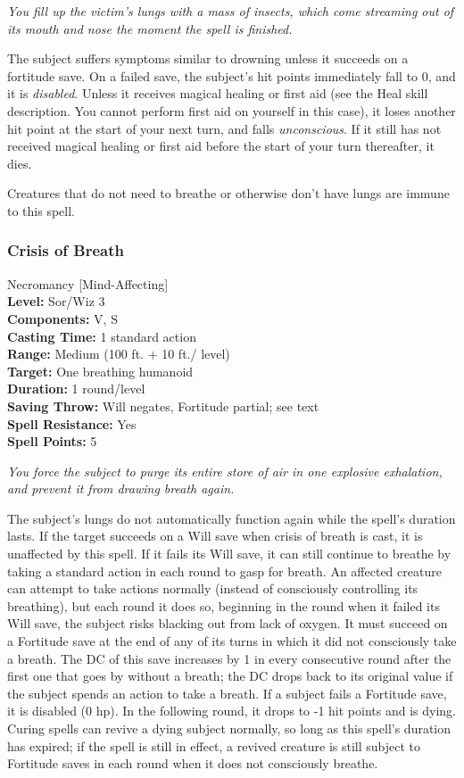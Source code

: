 \emph{You fill up the victim's lungs with a mass of insects, which come streaming out of its mouth and nose the moment the spell is finished.}

The subject suffers symptoms similar to drowning unless it succeeds on a fortitude save.
On a failed save, the subject's hit points immediately fall to 0, and it is \emph{disabled}.
Unless it receives magical healing or first aid (see the Heal skill description. You cannot perform first aid on yourself in this case), it loses another hit point at the start of your next turn, and falls \emph{unconscious}. If it still has not received magical healing or first aid before the start of your turn thereafter, it dies.

Creatures that do not need to breathe or otherwise don't have lungs are immune to this spell.
\subsubsection{Crisis of Breath}
\label{Spell:CrisisOfBreath}
Necromancy [Mind-Affecting]
\\ \textbf{Level:} Sor/Wiz 3
\\ \textbf{Components:} V, S
\\ \textbf{Casting Time:} 1 standard action
\\ \textbf{Range:} Medium (100 ft. + 10 ft./ level)
\\ \textbf{Target:} One breathing humanoid
\\ \textbf{Duration:} 1 round/level
\\ \textbf{Saving Throw:} Will negates, Fortitude partial; see text
\\ \textbf{Spell Resistance:} Yes
\\ \textbf{Spell Points:} 5

\emph{You force the subject to purge its entire store of air in one explosive exhalation, and prevent it from drawing breath again.}

The subject's lungs do not automatically function again while the spell's duration lasts.
If the target succeeds on a Will save when crisis of breath is cast, it is unaffected by this spell. 
If it fails its Will save, it can still continue to breathe by taking a standard action in each round to gasp for breath.
An affected creature can attempt to take actions normally (instead of consciously controlling its breathing), 
but each round it does so, beginning in the round when it failed its Will save, the subject risks blacking out from lack of oxygen. 
It must succeed on a Fortitude save at the end of any of its turns in which it did not consciously take a breath. 
The DC of this save increases by 1 in every consecutive round after the first one that goes by without a breath; 
the DC drops back to its original value if the subject spends an action to take a breath.
If a subject fails a Fortitude save, it is disabled (0 hp). 
In the following round, it drops to -1 hit points and is dying. 
Curing spells can revive a dying subject normally, so long as this spell's duration has expired; 
if the spell is still in effect, a revived creature is still subject to Fortitude saves in each round when it does not consciously breathe.


